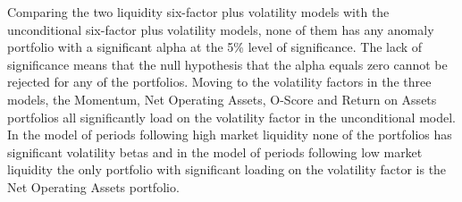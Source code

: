 \documentclass[a4paper]{article}                 %
\begin{document}
Comparing the two liquidity six-factor plus volatility models with the unconditional six-factor plus volatility models, none of them has any anomaly portfolio with a significant alpha at the 5\% level of significance. The lack of significance means that the null hypothesis that the alpha equals zero cannot be rejected for any of the portfolios. Moving to the volatility factors in the three models, the Momentum, Net Operating Assets, O-Score and Return on Assets portfolios all significantly load on the volatility factor in the unconditional model. In the model of periods following high market liquidity none of the portfolios has significant volatility betas and in the model of periods following low market liquidity the only portfolio with significant loading on the volatility factor is the Net Operating Assets portfolio. 





\end{document}

